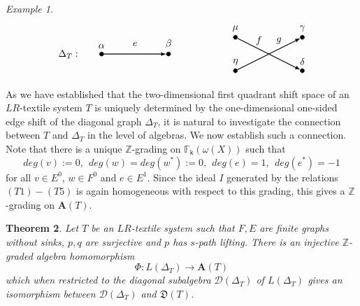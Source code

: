 \documentclass[a4paper,reqno,12pt]{amsart}
\newtheorem{thm}{Theorem}[section]
\theoremstyle{definition}
\theoremstyle{remark}
\newtheorem{example}[thm]{Example}
\begin{document}
\begin{example}
\[
\begin{tikzpicture}[scale=1.2]
\node[inner sep=1.5pt, circle,draw,fill=black,label={$\alpha$}] (A) at (0,0) {};	
\node[inner sep=1.5pt, circle,draw,fill=black,label={$\beta$}] (B) at (2,0) {};
\node[inner sep=1.5pt, circle,draw,fill=black,label={$\mu$}] (C) at (4,0.5) {};	
\node[inner sep=1.5pt, circle,draw,fill=black,label={$\gamma$}] (D) at (6,0.5) {};
\node[inner sep=1.5pt, circle,draw,fill=black,label={$\eta$}] (E) at (4,-0.5) {};	
\node[inner sep=1.5pt, circle,draw,fill=black,label={$\delta$}] (F) at (6,-0.5) {};

\path[->,black, >=latex,thick] (A) edge [left] node[above=0.05cm]{} (B);
\path[->, >=latex,thick] (C) edge [left] node[below=0.05cm]{} (F);
\path[->, >=latex,thick] (E) edge [left] node[below=0.05cm]{} (D);

\node at (1,0.3) {$e$};
\node at (5.3,0.4) {$g$};
\node at (4.7,0.4) {$f$};

\node at (-1,0) {$\Delta_T:$};

\end{tikzpicture}
\]
\end{example}

As we have established that the two-dimensional first quadrant shift space of an $LR$-textile system $T$ is uniquely determined by the one-dimensional one-sided edge shift of the diagonal graph $\Delta_T$, it is natural to investigate the connection between $T$ and $\Delta_T$ in the level of algebras. We now establish such a connection. Note that there is a unique $\mathbb{Z}$-grading on $\mathbb{F}_\mathsf{k}(\omega(X))$ such that \[deg(v):=0,~~deg(w)=deg(w^*):=0,~~deg(e)=1,~~deg(e^*)=-1\] for all $v\in E^0$, $w\in F^0$ and $e\in E^1$. Since the ideal $I$ generated by the relations $(T1)-(T5)$ is again homogeneous with respect to this grading, this gives a $\mathbb{Z}$-grading on $\mathbf{A}(T)$. 

\begin{thm}\label{th the connection between A(T) and L(Delta_T)}
Let $T$ be an $LR$-textile system such that $F,E$ are finite graphs without sinks, $p,q$ are surjective and $p$ has $s$-path lifting. There is an injective $\mathbb{Z}$-graded algebra homomorphism \[\Phi:L(\Delta_T)\longrightarrow \mathbf{A}(T)\] which when restricted to the diagonal subalgebra $\mathcal{D}(\Delta_T)$ of $L(\Delta_T)$ gives an isomorphism between $\mathcal{D}(\Delta_T)$ and $\mathfrak{D}(T)$. 
\end{thm}
\end{document}

